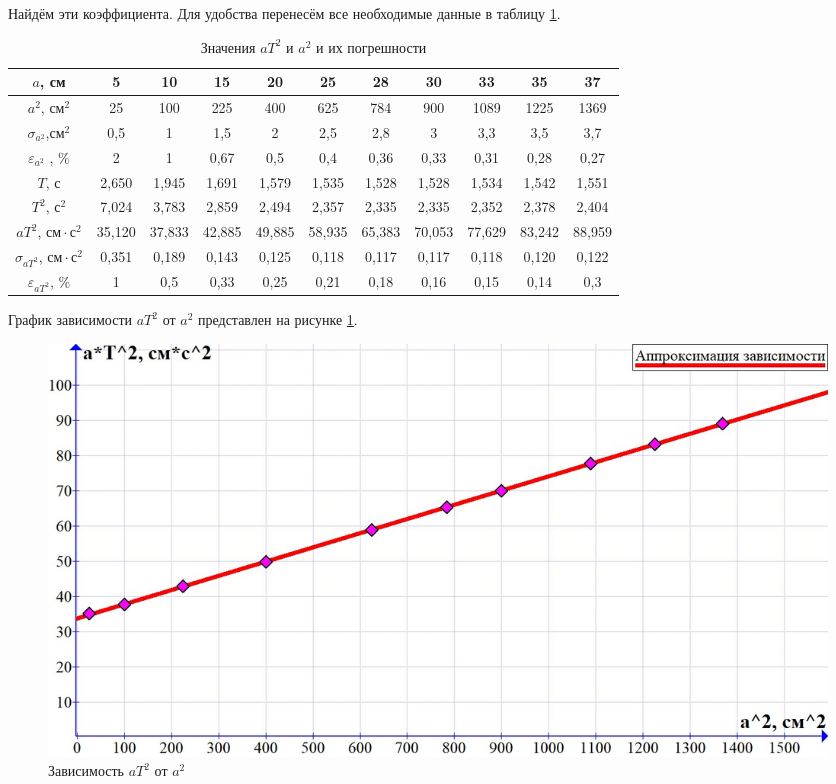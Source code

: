 \documentclass[a4paper,12pt]{article} %
\begin{document}
Найдём эти коэффициента. Для удобства перенесём все необходимые данные в таблицу \ref{tab3}.

\begin{table}[h!]
	\begin{tabular}{|c|c|c|c|c|c|c|c|c|c|c|}
		\hline
		$ a $, см           & 5      & 10     & 15     & 20     & 25     & 28     & 30     & 33     & 35     & 37     \\ \hline
		$ a^2 $, $ \text{см}^2 $  & 25     & 100    & 225    & 400    & 625    & 784    & 900    & 1089   & 1225   & 1369   \\ \hline
		$ \sigma_{a^2}$,$ \text{см}^2  $         & 0,5    & 1      & 1,5    & 2      & 2,5    & 2,8    & 3      & 3,3    & 3,5    & 3,7    \\ \hline
		$ \varepsilon_{a^2}$ , $ \% $         & 2    & 1      & 0,67    & 0,5      & 0,4    & 0,36    & 0,33      & 0,31    & 0,28    & 0,27    \\ \hline
		$ T $, с           & 2,650  & 1,945  & 1,691  & 1,579  & 1,535  & 1,528  & 1,528  & 1,534  & 1,542  & 1,551  \\ \hline
		$ T^2 $, $ \text{с}^2 $   & 7,024  & 3,783  & 2,859  & 2,494  & 2,357  & 2,335  & 2,335  & 2,352  & 2,378  & 2,404  \\ \hline
		$ aT^2 $, $ \text{см} \cdot \text{с}^2 $ & 35,120 & 37,833 & 42,885 & 49,885 & 58,935 & 65,383 & 70,053 & 77,629 & 83,242 & 88,959 \\ \hline
		$ \sigma_{aT^2} $, $ \text{см} \cdot \text{с}^2  $       & 0,351  & 0,189  & 0,143  & 0,125  & 0,118  & 0,117  & 0,117  & 0,118  & 0,120  & 0,122  \\ \hline
		$ \varepsilon_{aT^2} $, $ \% $       & 1  & 0,5  & 0,33  & 0,25  & 0,21  & 0,18  & 0,16  & 0,15  & 0,14  & 0,3  \\ \hline
	\end{tabular}
\caption{Значения $ aT^2 $ и $ a^2 $ и их погрешности}
\label{tab3}
\end{table}

График зависимости $ aT^2 $ от $ a^2 $ представлен на рисунке \ref{graph}.

\begin{figure}[h!]
	\includegraphics[scale=0.38]{graph_file.jpeg}
	\caption{Зависимость $ aT^2 $ от $ a^2 $}
	\label{graph}
\end{figure}
\end{document}
